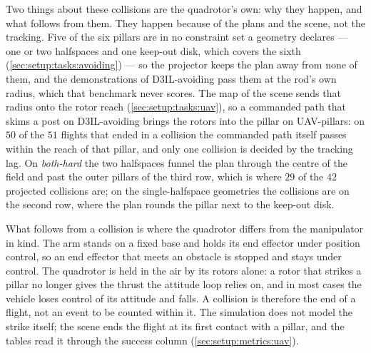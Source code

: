 Two things about these collisions are the quadrotor's own: why they happen, and what follows from them.
They happen because of the plans and the scene, not the tracking. Five of the six pillars are in no
constraint set a geometry declares --- one or two halfspaces and one keep-out disk, which covers the sixth
(\autoref{sec:setup:tasks:avoiding}) --- so the projector keeps the plan away from none of them, and the
demonstrations of D3IL-avoiding pass them at the rod's own radius, which that benchmark never scores. The
map of the scene sends that radius onto the rotor reach (\autoref{sec:setup:tasks:uav}), so a commanded path
that skims a post on D3IL-avoiding brings the rotors into the pillar on UAV-pillars: on $50$ of the $51$
flights that ended in a collision the commanded path itself passes within the reach of that pillar, and only
one collision is decided by the tracking lag. On \emph{both-hard} the two halfspaces funnel the plan through
the centre of the field and past the outer pillars of the third row, which is where $29$ of the $42$
projected collisions are; on the single-halfspace geometries the collisions are on the second row, where the
plan rounds the pillar next to the keep-out disk.

What follows from a collision is where the quadrotor differs from the manipulator in kind. The arm stands on
a fixed base and holds its end effector under position control, so an end effector that meets an obstacle is
stopped and stays under control. The quadrotor is held in the air by its rotors alone: a rotor that strikes a
pillar no longer gives the thrust the attitude loop relies on, and in most cases the vehicle loses control of
its attitude and falls. A collision is therefore the end of a flight, not an event to be counted within it.
The simulation does not model the strike itself; the scene ends the flight at its first contact with a
pillar, and the tables read it through the success column (\autoref{sec:setup:metrics:uav}).

